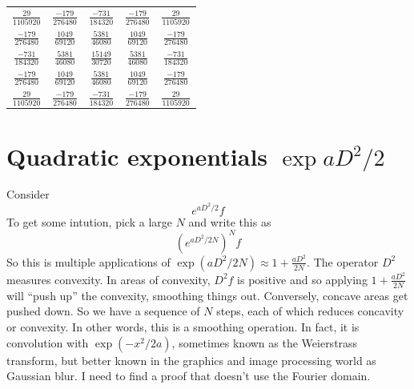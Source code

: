 \documentclass[a4paper]{article}
\theoremstyle{definition}
\begin{document}
\tabulinesep=1.2mm
\begin{tabu}{ccccc}
$\frac{29}{1105920}$ & $\frac{-179}{276480}$ & $\frac{-731}{184320}$ & $\frac{-179}{276480}$ & $\frac{29}{1105920}$ \\
$\frac{-179}{276480}$ & $\frac{1049}{69120}$ & $\frac{5381}{46080}$ & $\frac{1049}{69120}$ & $\frac{-179}{276480}$ \\
$\frac{-731}{184320}$ & $\frac{5381}{46080}$ & $\frac{15149}{30720}$ & $\frac{5381}{46080}$ & $\frac{-731}{184320}$ \\
$\frac{-179}{276480}$ & $\frac{1049}{69120}$ & $\frac{5381}{46080}$ & $\frac{1049}{69120}$ & $\frac{-179}{276480}$ \\
$\frac{29}{1105920}$ & $\frac{-179}{276480}$ & $\frac{-731}{184320}$ & $\frac{-179}{276480}$ & $\frac{29}{1105920}$ \\
\end{tabu}

\section{Quadratic exponentials $\exp{aD^2/2}$}
Consider
\[
e^{aD^2/2}f
\]
To get some intution, pick a large $N$ and write this as
\[
(e^{aD^2/2N})^Nf
\]
So this is multiple applications of $\exp(aD^2/2N) \approx 1+\frac{aD^2}{2N}$.
The operator $D^2$ measures convexity.
In areas of convexity, $D^2f$ is positive and so applying $1+\frac{aD^2}{2N}$ will ``push up'' the convexity, smoothing things out.
Conversely, concave areas get pushed down.
So we have a sequence of $N$ steps, each of which reduces concavity or convexity.
In other words, this is a smoothing operation.
In fact, it is convolution with $\exp(-x^2/2a)$, sometimes known as the Weierstrass transform, but better known in the graphics and image processing world as Gaussian blur.
I need to find a proof that doesn't use the Fourier domain.
\end{document}

